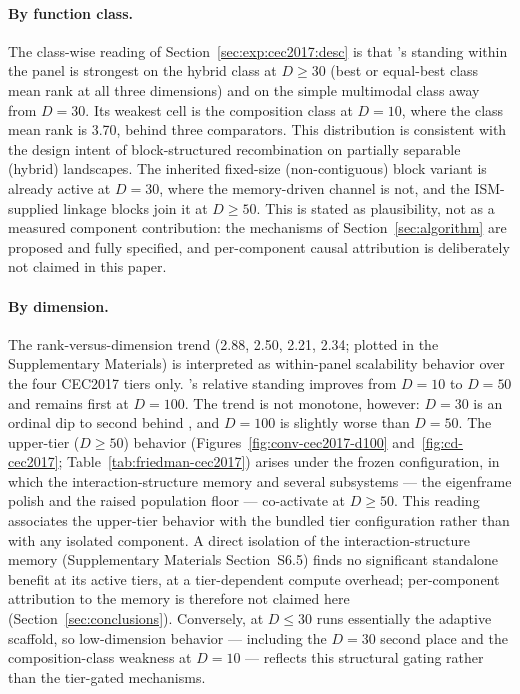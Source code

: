 \paragraph{By function class.}
The class-wise reading of
Section~\ref{sec:exp:cec2017:desc} is that \dtgsk{}'s standing
within the panel is strongest on the hybrid class at $D \geq 30$
(best or equal-best class mean rank at all three dimensions) and on
the simple multimodal class away from $D = 30$. Its weakest cell is the
composition class at $D = 10$, where the class mean rank is 3.70, behind
three comparators.
This distribution is consistent with the design intent of
block-structured recombination on partially separable (hybrid)
landscapes. The inherited fixed-size (non-contiguous) block variant is
already active at $D = 30$, where the memory-driven channel is not, and the
ISM-supplied linkage blocks join it at $D \geq 50$. This is stated as
plausibility, not as a measured component contribution: the
mechanisms of
Section~\ref{sec:algorithm} are proposed
and fully specified, and per-component causal attribution is
deliberately not claimed in this paper.

\paragraph{By dimension.}
The rank-versus-dimension trend (2.88,
2.50, 2.21, 2.34; plotted in the Supplementary Materials) is interpreted as
within-panel scalability behavior over the four CEC2017 tiers only.
\dtgsk{}'s relative standing
improves from $D = 10$ to $D = 50$ and remains first at $D = 100$.
The trend is not monotone, however: $D = 30$ is an ordinal dip to
second behind \egsk{}, and $D = 100$ is slightly worse than $D = 50$.
The upper-tier ($D \geq 50$) behavior (Figures~\ref{fig:conv-cec2017-d100}
and~\ref{fig:cd-cec2017}; Table~\ref{tab:friedman-cec2017}) arises under
the frozen configuration, in which the interaction-structure memory
and several subsystems --- the eigenframe polish and the raised population
floor --- co-activate at $D \geq 50$.
This reading associates the upper-tier behavior with the bundled
tier configuration rather than with any isolated component. A direct
isolation of the interaction-structure memory (Supplementary Materials
Section~S6.5) finds no significant standalone benefit at its active
tiers, at a tier-dependent compute overhead; per-component attribution to
the memory is therefore not claimed here (Section~\ref{sec:conclusions}).
Conversely, at $D \leq 30$ \dtgsk{} runs essentially the
adaptive scaffold, so low-dimension behavior --- including the
$D = 30$ second place and the composition-class weakness at
$D = 10$ --- reflects this structural gating rather than the tier-gated
mechanisms.

